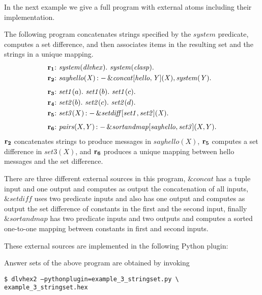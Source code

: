 \documentclass[a4paper, titlepage]{article}
\newcommand{\mi}[1]{\mathit{#1}}
\newcommand{\ext}[3]{\ensuremath{\&{\mathit{#1}}[#2](#3)}}
\DeclareMathOperator{\leftimpl}{:-}
\newcommand\leftaligned[1]{\par \smallskip \noindent \qquad #1 \smallskip \par}
\newcommand{\row}[1]{%
  \ensuremath{\color{black}\ensuremath{\mathbf{#1}} \color{black}}%
}
\newcommand{\rowprefix}[1]{%
  \ensuremath{\color{black}\mathbf{#1{:}}\ }%
}
\begin{document}
In the next example we give a full program with external atoms
including their implementation.
\begin{exmp}
The following program concatenates strings specified
by the $\mi{system}$ predicate,
computes a set difference,
and then associates items in the resulting set
and the strings in a unique mapping.
\begin{align*}
  \rowprefix{r_1}& \mathit{system}(\mathit{dlvhex}). \ 
    \mathit{system}(\mathit{clasp}). \\  
  \rowprefix{r_2}& \mathit{sayhello(X)} \leftimpl 
    \ext{\mathit{concat}}{\mathit{hello, Y}}{\mathit{X}}, 
    \mathit{system(Y).}  \\[1ex] 
  \rowprefix{r_3}& \mathit{set1}(a). \ \mathit{set1}(b). \ 
    \mathit{set1}(c).\\
  \rowprefix{r_4}& \mathit{set2}(b). \ \mathit{set2}(c). \ 
    \mathit{set2}(d).\\
  \rowprefix{r_5}& \mathit{set3}(X) \leftimpl 
    \ext{\mathit{setdiff}}{\mathit{set1, set2}}{\mathit{X}}.  \\[1ex]
  \rowprefix{r_6}& \mathit{pairs}(X,Y) \leftimpl 
    \ext{\mathit{sortandmap}}{\mathit{sayhello,set3}}{X,Y}.
\end{align*}
\row{r_2} concatenates strings to produce messages in $\mi{sayhello}(X)$,
\row{r_5} computes a set difference in $\mi{set3}(X)$,
and \row{r_6} produces a unique mapping between hello messages
and the set difference.

There are three different external sources in this program, 
$\mathit{\&concat}$ has a tuple input and one output
and computes as output the concatenation of all inputs,
$\mathit{\&setdiff}$ uses two predicate inputs and also has one output
and computes as output the set difference of constants
in the first and the second input,
finally $\mathit{\&sortandmap}$ has two predicate inputs and two outputs
and computes a sorted one-to-one mapping between constants
in first and second inputs.

These external sources are implemented in the following Python plugin:



\noindent
Answer sets of the above program are obtained by invoking

\leftaligned{\texttt{\$ dlvhex2 --pythonplugin=example\_3\_stringset.py \textbackslash \\
\hphantom{\qquad \$ dlvhex2 }example\_3\_stringset.hex}}


\end{exmp}
\end{document}
